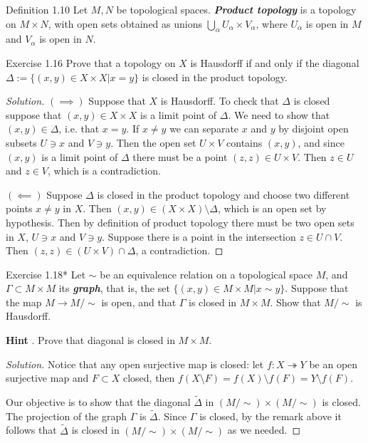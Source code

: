 \begin{thing3}{Definition 1.10}\leavevmode
	Let $M,N$ be topological spaces. \textit{\textbf{Product topology}} is a topology on $M \times N$, with open sets obtained as unions $\bigcup_{\alpha} U_\alpha \times V_\alpha$, where $U_\alpha$ is open in $M$ and $V_\alpha$ is open in $N$.
\end{thing3}

\begin{thing4}{Exercise 1.16}\leavevmode
	Prove that a topology on $X$ is Hausdorff if and only if the diagonal $\Delta:=\{(x,y) \in X \times X|x=y\}$ is closed in the product topology.
\end{thing4}

\begin{proof}[Solution]\leavevmode
	$(\implies )$ Suppose that $X$ is Hausdorff. To check that $\Delta$ is closed suppose that $(x,y) \in X \times X$ is a limit point of $\Delta$. We need to show that $(x,y) \in \Delta$, i.e. that $x=y$. If $x \neq y$ we can separate $x$ and  $y$ by disjoint open subsets $U \ni x$ and  $V \ni y$. Then the open set $U \times V$ contains $(x,y)$,  and since $(x,y)$ is a limit point of  $\Delta$ there must be a point $(z,z) \in U \times V$. Then $z \in U$ and $z \in V$, which is a contradiction.

$(\impliedby)$ Suppose $\Delta$ is closed in the product topology and choose two different points $x \neq y$ in $X$. Then $(x,y) \in (X \times X)\setminus \Delta$, which is an open set by hypothesis. Then by definition of product topology there must be two open sets in $X$,  $U \ni x$ and $V \ni y$. Suppose there is a point in the intersection $z \in U \cap V$. Then $(z,z) \in (U \times V) \cap \Delta$, a contradiction.
\end{proof}

\begin{thing4}{Exercise 1.18*}\leavevmode
	Let $\sim$ be an equivalence relation on a topological space $M$, and $\Gamma \subset M \times M$ its \textit{\textbf{graph}}, that is, the set $\{(x,y) \in M \times M|x \sim y\}$. Suppose that the map $M \longrightarrow M/\sim$ is open, and that $\Gamma$ is closed in $M \times M$. Show that $M/\sim$ is Hausdorff.

	\textbf{Hint} . Prove that diagonal is closed in $M \times M$.
\end{thing4}

\begin{proof}[Solution]\leavevmode
Notice that any open surjective map is closed: let $f:X \twoheadrightarrow Y$ be an open surjective map and $F\subset X$ closed, then $f(X\setminus F)=f(X)\setminus f(F)=Y\setminus f(F)$.

Our objective is to show that the diagonal $\tilde{\Delta}$ in $(M/\sim)\times(M/\sim)$ is closed. The projection of the graph $\Gamma$ is $\tilde{\Delta}$. Since $\Gamma$ is closed, by the remark above it follows that $\tilde{\Delta}$ is closed in $(M/\sim)\times(M/\sim)$ as we needed.
\end{proof}

